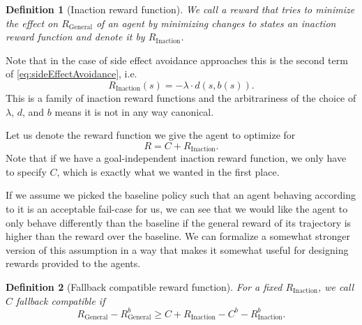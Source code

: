\documentclass{article}
\newtheorem{definition}{Definition}
\newcommand{\rewardFunction}{R}
\newcommand{\generalRewardFunction}{\rewardFunction_{\mathrm{General}}}
\newcommand{\inactionRewardFunction}{\rewardFunction_{\mathrm{Inaction}}}
\newcommand{\corruption}{C}
\newcommand{\deviationFromBaseline}{d}
\newcommand{\baseline}{b}
\begin{document}
		\begin{definition}[Inaction reward function]
			We call a reward that tries to minimize the effect on $\generalRewardFunction$ of an agent
			by minimizing changes to states an \emph{inaction reward function} and denote it by
			$\inactionRewardFunction$.
			\label{def:inactionReward}
		\end{definition}

		Note that in the case of side effect avoidance approaches this is the second term of
		\eqref{eq:sideEffectAvoidance}, i.e.
		\begin{equation*}
			\inactionRewardFunction\left( s \right) =
			-\lambda \cdot \deviationFromBaseline\left( s, \baseline\left( s \right) \right).
		\end{equation*}
		This is a family of inaction reward functions and the arbitrariness of the choice of $\lambda$,
		$\deviationFromBaseline$, and $\baseline$ means it is not in any way canonical.

		Let us denote the reward function we give the agent to optimize for
		\begin{equation*}
			\rewardFunction = \corruption + \inactionRewardFunction.
		\end{equation*}
		Note that if we have a goal-independent inaction reward function, we only have to specify
		$\corruption$, which is exactly what we wanted in the first place.

		If we assume we picked the baseline policy such that an agent behaving according to it
		is an acceptable fail-case for us, we can see that we would like the agent to only behave
		differently than the baseline if the general reward of its trajectory is higher than
		the reward over the baseline. We can formalize a somewhat stronger version of this assumption
		in a way that makes it somewhat useful for designing rewards provided to the agents.

		\begin{definition}[Fallback compatible reward function]
			For a fixed $\inactionRewardFunction$, we call $\corruption$ \emph{fallback compatible} if
			\begin{equation}
				\generalRewardFunction - \generalRewardFunction^\baseline \geq
				\corruption + \inactionRewardFunction -
				\corruption^\baseline - \inactionRewardFunction^\baseline.
			\label{eq:fallbackCompatible}
			\end{equation}
			\label{def:fallbackCompatible}
		\end{definition}
\end{document}

